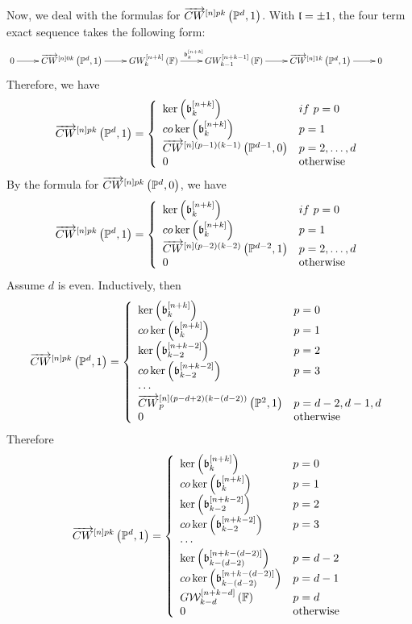 \documentclass[12pt]{article}
\begin{document}
Now, we deal with the formulas for  $\ora{CW}^{\LRt{n}pk}\LRf{{\BP}^d, 1}$.
With $\l=\pm 1$, the four term exact sequence takes the following form: 
 $$ 
  \diagram
  0 \ar[r] &
 \ora{CW}^{\LRt{n}0k}\LRf{{\BP}^d,1} \ar[r] &  GW^{\LRt{n+k}}_k\LRf{{\BF}} \ar[r]^{\b_k^{\LRt{n+k}}}
  &GW^{\LRt{n+k-1}}_{k-1}\LRf{{\BF}} \ar[r]%
  &
 \ora{CW}^{\LRt{n}1k}\LRf{{\BP}^d, 1} \ar[r] & 0 &\\
 \enddiagram
$$
Therefore, we have
$$
\ora{CW}^{\LRt{n}pk}\LRf{{\BP}^d, 1} =
\LBrace{{ll}
\ker\LRf{\b_k^{\LRt{n+k}}} & if ~p=0\\
co\ker\LRf{\b_k^{\LRt{n+k}}} & p=1\\
\ora{CW}^{\LRt{n}(p-1)(k-1)}\LRf{{\BP}^{d-1}, 0} &p=2, \ldots, d\\
0 & {\rm otherwise}\\
} 
$$
By the formula for $\ora{CW}^{\LRt{n}pk}\LRf{{\BP}^d, 0}$, we have %
$$
\ora{CW}^{\LRt{n}pk}\LRf{{\BP}^d, 1} 
=
\LBrace{{ll}
\ker\LRf{\b_k^{\LRt{n+k}}} & if ~p=0\\
co\ker\LRf{\b_k^{\LRt{n+k}}} & p=1\\
\ora{CW}^{\LRt{n}(p-2)\LRf{k-2}}\LRf{{\BP}^{d-2}, 1} &p=2, \ldots, d\\
0 & {\rm otherwise}\\
} 
$$
Assume $d$ is even. Inductively, then 
$$
\ora{CW}^{\LRt{n}pk}\LRf{{\BP}^d, 1} =
%
\LBrace{{ll}
\ker\LRf{\b_k^{\LRt{n+k}}} & p=0\\
co\ker\LRf{\b_k^{\LRt{n+k}}} & p=1\\
\ker\LRf{\b_{k-2}^{\LRt{n+k-2}}} & p=2\\
co\ker\LRf{\b_{k-2}^{\LRt{n+k-2}}} & p=3\\
\cdots\\
\ora{CW}^{\LRt{n}(p-d+2)\LRf{k-(d-2)}}_p\LRf{{\BP}^{2}, 1} &p=d-2, d-1, d\\
0 & {\rm otherwise}\\
} 
$$
Therefore
$$
\ora{CW}^{\LRt{n}pk}\LRf{{\BP}^d, 1} =
%
\LBrace{{ll}
\ker\LRf{\b_k^{\LRt{n+k}}} & p=0\\
co\ker\LRf{\b_k^{\LRt{n+k}}} & p=1\\
\ker\LRf{\b_{k-2}^{\LRt{n+k-2}}} & p=2\\
co\ker\LRf{\b_{k-2}^{\LRt{n+k-2}}} & p=3\\
\cdots\\
\ker\LRf{\b_{k-(d-2)}^{\LRt{n+k-(d-2)}}} &p=d-2\\
co\ker\LRf{\b_{k-(d-2)}^{\LRt{n+k-(d-2)}}} &p= d-1\\
G{\CW}_{k-d}^{\LRt{n+k-d}}\LRf{{\BF}}&p= d\\
0 & {\rm otherwise}\\
} 
$$
\end{document}

